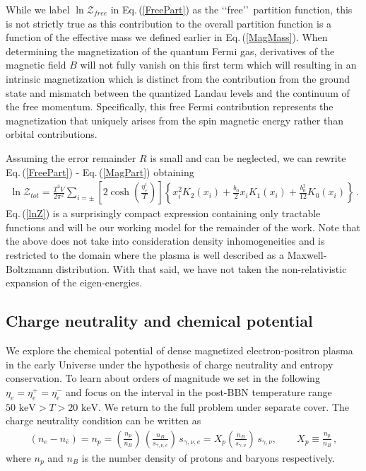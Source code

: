 \documentclass[universe,article,submit,moreauthors,pdftex,a4paper]{Definitions/mdpi}
\newcommand{\keV}{\text{ keV}}
\newcommand{\req}[1]{Eq.\,(\ref{#1})}
\newcommand*{\xblue}{\color{black}}
\begin{document}
While we label $\ln\mathcal{Z}_{free}$ in \req{FreePart} as the \lq\lq free\rq\rq\ partition function, this is not strictly true as this contribution to the overall partition function is a function of the effective mass we defined earlier in \req{MagMass}. When determining the magnetization of the quantum Fermi gas, derivatives of the magnetic field $B$ will not fully vanish on this first term which will resulting in an intrinsic magnetization which is distinct from the contribution from the ground state and mismatch between the quantized Landau levels and the continuum of the free momentum. Specifically, this free Fermi contribution represents the magnetization that uniquely arises from the spin magnetic energy rather than orbital contributions.

Assuming the error remainder $R$ is small and can be neglected, we can rewrite \req{FreePart} - \req{MagPart} obtaining
\begin{align}
 \label{lnZ}
 \ln\mathcal{Z}_{tot}=\frac{T^3V}{2\pi^2}\sum_{i=\pm}\left[2\cosh\left(\frac{\eta_{e}^{i}}{T}\right)\right]\left\{x_i^{2} K_2\left(x_i\right)+\frac{b_0}{2}x_iK_1\left(x_i\right)+\frac{b^2_0}{12}K_0\left(x_i\right)\right\}\,.
\end{align}
\req{lnZ} is a surprisingly compact expression containing only tractable functions and will be our working model for the remainder of the work. Note that the above does not take into consideration density inhomogeneities and is restricted to the domain where the plasma is well described as a Maxwell-Boltzmann distribution. With that said, we have not taken the non-relativistic expansion of the eigen-energies.

\subsection{Charge neutrality and chemical potential}\label{sec:ChargeNeutrality}
\noindent We explore the chemical potential of dense magnetized electron-positron plasma in the early Universe under the hypothesis of charge neutrality and entropy conservation. {\xblue To learn about orders of magnitude we set in the following $\eta_{e}=\eta_{e}^{+}=\eta_{e}^{-}$ and focus on the interval in the post-BBN temperature range $50\keV>T>20\keV$. We return to the full problem under separate cover.} The charge neutrality condition can be written as
\begin{align}
 \label{density_proton}
 \left(n_{e}-n_{\bar{e}}\right)=n_{p}=\left(\frac{n_{p}}{n_{B}}\right)\,\left(\frac{n_{B}}{s_{\gamma,\nu,e}}\right)\,s_{\gamma,\nu,e}= X_p\left(\frac{n_B}{s_{\gamma,\nu}}\right)\,s_{\gamma,\nu},\qquad X_p\equiv\frac{n_p}{n_B}\,,
\end{align}
where $n_{p}$ and $n_B$ is the number density of protons and baryons respectively.
\end{document}
